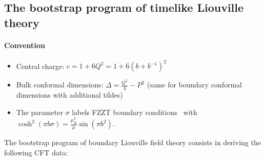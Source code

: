 \documentclass[a4paper]{article}
\begin{document}
\subsection{The bootstrap program of timelike Liouville theory}\label{subsec:TimelikeLiouville}
\paragraph{Convention}
\begin{itemize}
  \item Central charge: $c = 1+ 6Q^2 = 1+ 6(b+b^{-1})^2$
  \item Bulk conformal dimensions: $\Delta = \frac{Q^2}{4}-P^2$ (same for boundary conformal dimensions with additional tildes)
  \item The parameter $\sigma$ labels FZZT boundary conditions~\cite{fateev2000boundaryliouvillefieldtheory} with $\cosh^2(\pi b \sigma) = \frac{\mu^2_B}{\mu}\sin(\pi b^2)$.
\end{itemize}
The bootstrap program of boundary Liouville field theory consists in deriving the following CFT data:
\end{document}
